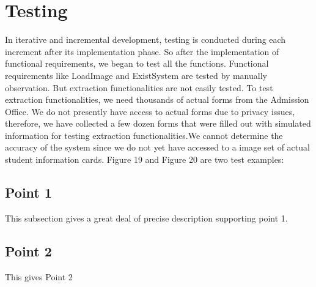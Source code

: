 \section{Testing}												
\label{sec:Testing}
In iterative and incremental development, testing is conducted during each increment after its implementation phase. So after the implementation of functional requirements, we began to test all the functions. Functional requirements like LoadImage and ExistSystem
are tested by manually observation. But extraction functionalities are not easily tested. To test extraction functionalities, we need thousands of actual forms from the Admission Office. We do not presently have access to actual forms due to privacy issues, therefore, we have collected a few dozen forms that were filled out with simulated information for testing extraction functionalities.We cannot determine the accuracy of the system since we do not yet have accessed to a image set of actual student information cards. Figure 19 and Figure 20 are two test examples:

\subsection{Point 1}
This subsection gives a great deal of precise description supporting point 1.  


\subsection{Point 2}
This gives Point 2